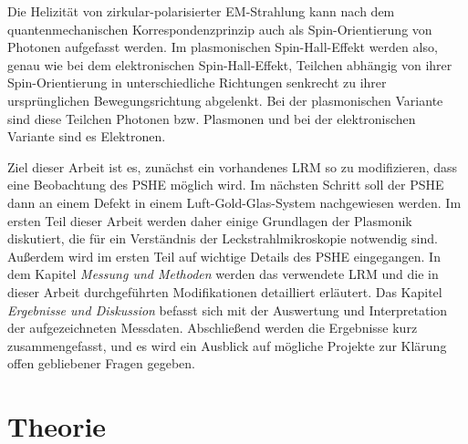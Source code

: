 \documentclass[titlepage,  ngerman]{article}
\begin{document}
	Die Helizität von zirkular-polarisierter EM-Strahlung kann nach dem quantenmechanischen Korrespondenzprinzip auch als Spin-Orientierung von Photonen aufgefasst werden.	Im plasmonischen Spin-Hall-Effekt werden also, genau wie bei dem elektronischen Spin-Hall-Effekt, Teilchen abhängig von ihrer Spin-Orientierung in unterschiedliche Richtungen senkrecht zu ihrer ursprünglichen Bewegungsrichtung abgelenkt. Bei der plasmonischen Variante sind diese Teilchen Photonen bzw. Plasmonen und bei der elektronischen Variante sind es Elektronen. \cite{Inoue.2005}
	
	Ziel dieser Arbeit ist es, zunächst ein vorhandenes LRM so zu modifizieren, dass eine Beobachtung des PSHE möglich wird. Im nächsten Schritt soll der PSHE dann an einem Defekt in einem Luft-Gold-Glas-System nachgewiesen werden. Im ersten Teil dieser Arbeit werden daher einige Grundlagen der Plasmonik diskutiert, die für ein Verständnis der Leckstrahlmikroskopie notwendig sind. Außerdem wird im ersten Teil auf wichtige Details des PSHE eingegangen. In dem Kapitel \textit{Messung und Methoden} werden das verwendete LRM und die in dieser Arbeit durchgeführten Modifikationen detailliert erläutert. Das Kapitel \textit{Ergebnisse und Diskussion} befasst sich mit der Auswertung und Interpretation der aufgezeichneten Messdaten. Abschließend werden die Ergebnisse kurz zusammengefasst, und es wird ein Ausblick auf mögliche Projekte zur Klärung offen gebliebener Fragen gegeben.
	
	\newpage	
	\section{Theorie}
\end{document}
